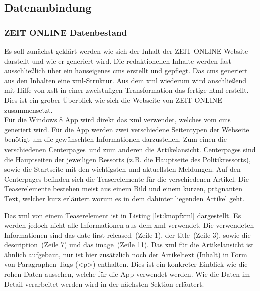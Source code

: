 \documentclass[12pt,a4paper,bibtotoc]{scrartcl}
\begin{document}
\subsection{Datenanbindung}
\label{subsec:datenanbindung}

\subsubsection{ZEIT ONLINE Datenbestand}
\label{subsubsec:zondatenbestand}
Es soll zunächst geklärt werden wie sich der Inhalt der ZEIT ONLINE Website darstellt und wie er generiert wird. Die redaktionellen Inhalte werden fast ausschließlich über ein hauseigenes \ac{cms} erstellt und gepflegt. Das \ac{cms} generiert aus den Inhalten eine \ac{xml}-Struktur. Aus dem \ac{xml} wiederum wird anschließend mit Hilfe von \ac{xslt} in einer zweistufigen Transformation das fertige \ac{html} erstellt. Dies ist ein grober Überblick wie sich die Webseite von ZEIT ONLINE zusammensetzt.\\
Für die Windows 8 App wird direkt das \ac{xml} verwendet, welches vom \ac{cms} generiert wird. Für die App werden zwei verschiedene Seitentypen der Webseite benötigt um die gewünschten Informationen darzustellen. Zum einen die verschiedenen \glqq Centerpages\grqq\ und zum anderen die Artikelansicht. Centerpages sind die Hauptseiten der jeweiligen Ressorts (z.B. die Hauptseite des Politikressorts), sowie die Startseite mit den wichtigsten und aktuellsten Meldungen. Auf den Centerpages befinden sich die Teaserelemente für die verschiedenen Artikel. Die Teaserelemente bestehen meist aus einem Bild und einem kurzen, prägnanten Text, welcher kurz erläutert worum es in dem dahinter liegenden Artikel geht.\\

\begin{minipage}{\linewidth}

\end{minipage}

Das \ac{xml} von einem Teaserelement ist in Listing \ref{lst:knopfxml} dargestellt. Es werden jedoch nicht alle Informationen aus dem \ac{xml} verwendet. Die verwendeten Informationen sind das \glqq date-first-released\grqq\ (Zeile 1), der \glqq title\grqq\ (Zeile 3), sowie die \glqq description\grqq\ (Zeile 7) und das \glqq image\grqq\ (Zeile 11). Das \ac{xml} für die Artikelansicht ist ähnlich aufgebaut, nur ist hier zusätzlich noch der Artikeltext (Inhalt) in Form von Paragraphen-Tags (<p>) enthalten. Dies ist ein konkreter Einblick wie die rohen Daten aussehen, welche für die App verwendet werden. Wie die Daten im Detail verarbeitet werden wird in der nächsten Sektion erläutert.
\end{document}
